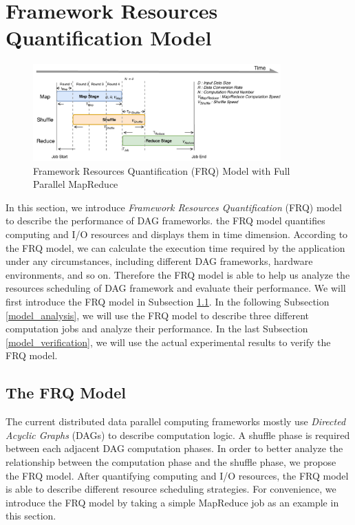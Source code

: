 {\color{blue}
\section{Framework Resources Quantification Model}\label{model}

\begin{figure}
    \centering
	\includegraphics[width=0.85\textwidth]{fig/model_basic}
	\caption{\color{blue}Framework Resources Quantification (FRQ) Model with Full Parallel MapReduce}
    \label{fig:model_basic}
    \vspace{-1em}
\end{figure}

In this section, we introduce \textit{Framework Resources Quantification} (FRQ) model to describe the performance of DAG frameworks.
the FRQ model quantifies computing and I/O resources and displays them in time dimension. According to the FRQ model, we can calculate the execution time required by the application under any circumstances, including different DAG frameworks, hardware environments, and so on. Therefore the FRQ model is able to help us analyze the resources scheduling of DAG framework and evaluate their performance. We will first introduce the FRQ model in Subsection \ref{model_overview}. In the following Subsection \ref{model_analysis}, we will use the FRQ model to describe three different computation jobs and analyze their performance. In the last Subsection \ref{model_verification}, we will use the actual experimental results to verify the FRQ model.

\subsection{The FRQ Model}\label{model_overview}
The current distributed data parallel computing frameworks mostly use \textit{Directed Acyclic Graphs} (DAGs) to describe computation logic. A shuffle phase is required between each adjacent DAG computation phases. In order to better analyze the relationship between the computation phase and the shuffle phase, we propose the FRQ model. After quantifying computing and I/O resources, the FRQ model is able to describe different resource scheduling strategies. For convenience, we introduce the FRQ model by taking a simple MapReduce job as an example in this section.

}

